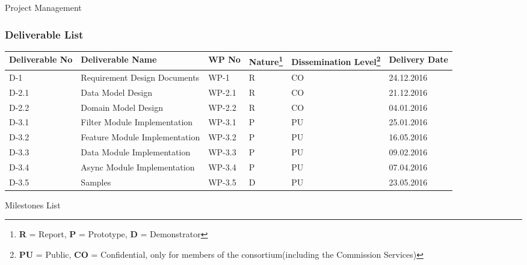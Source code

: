 \documentclass[12pt, a4paper]{article} \pagenumbering{gobble}
\begin{document}
\begin{section}{Project Management}
\subsubsection{Deliverable List}
    \begin{tabularx}{\textwidth}{|*{6}{Y|}}
        \hline
      \textbf{Deliverable No} & \textbf{Deliverable Name} & \textbf{WP No} & \textbf{Nature}\footnote{\textbf{R} = Report, \textbf{P} = Prototype, \textbf{D} = Demonstrator} & \textbf{Dissemination Level}\footnote{\textbf{PU} = Public, \textbf{CO} = Confidential, only for members of the consortium(including the Commission Services)} & \textbf{Delivery Date} \\
      \hline
        D-1 & Requirement Design Documents & WP-1 & R & CO & 24.12.2016 \\
        \hline
        D-2.1 & Data Model Design & WP-2.1 & R & CO & 21.12.2016 \\
        \hline
        D-2.2 & Domain Model Design & WP-2.2 & R & CO & 04.01.2016 \\
        \hline
        D-3.1 & Filter Module Implementation & WP-3.1 & P & PU & 25.01.2016 \\
        \hline
        D-3.2 & Feature Module Implementation & WP-3.2 & P & PU & 16.05.2016 \\
        \hline
        D-3.3 & Data Module Implementation & WP-3.3 & P & PU & 09.02.2016 \\
        \hline
        D-3.4 & Async Module Implementation & WP-3.4 & P & PU & 07.04.2016 \\
        \hline
        D-3.5 & Samples & WP-3.5 & D & PU & 23.05.2016 \\
        \hline
    \end{tabularx}
\begin{subsubsection}{Milestones List}


\end{subsubsection}
\end{section}
\end{document}

